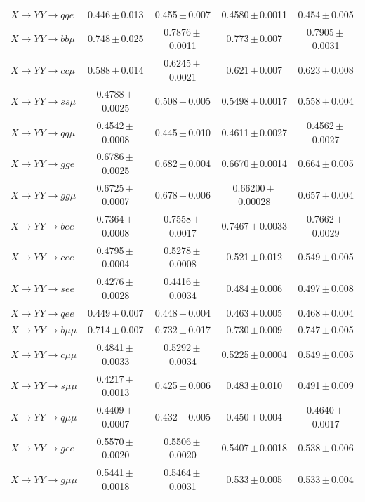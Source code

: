 \begin{landscape}
{\begin{longtable}{@{\extracolsep{\fill}}lcccc@{}}
$X\to YY\to qqe$ & 0.446\,$\pm$\,0.013 & 0.455\,$\pm$\,0.007 & 0.4580\,$\pm$\,0.0011 & 0.454\,$\pm$\,0.005 \\
$X\to YY\to bb\mu$ & 0.748\,$\pm$\,0.025 & 0.7876\,$\pm$\,0.0011 & 0.773\,$\pm$\,0.007 & 0.7905\,$\pm$\,0.0031 \\
$X\to YY\to cc\mu$ & 0.588\,$\pm$\,0.014 & 0.6245\,$\pm$\,0.0021 & 0.621\,$\pm$\,0.007 & 0.623\,$\pm$\,0.008 \\
$X\to YY\to ss\mu$ & 0.4788\,$\pm$\,0.0025 & 0.508\,$\pm$\,0.005 & 0.5498\,$\pm$\,0.0017 & 0.558\,$\pm$\,0.004 \\
$X\to YY\to qq\mu$ & 0.4542\,$\pm$\,0.0008 & 0.445\,$\pm$\,0.010 & 0.4611\,$\pm$\,0.0027 & 0.4562\,$\pm$\,0.0027 \\
$X\to YY\to gge$ & 0.6786\,$\pm$\,0.0025 & 0.682\,$\pm$\,0.004 & 0.6670\,$\pm$\,0.0014 & 0.664\,$\pm$\,0.005 \\
$X\to YY\to gg\mu$ & 0.6725\,$\pm$\,0.0007 & 0.678\,$\pm$\,0.006 & 0.66200\,$\pm$\,0.00028 & 0.657\,$\pm$\,0.004 \\
\midrule
$X\to YY\to bee$ & 0.7364\,$\pm$\,0.0008 & 0.7558\,$\pm$\,0.0017 & 0.7467\,$\pm$\,0.0033 & 0.7662\,$\pm$\,0.0029 \\
$X\to YY\to cee$ & 0.4795\,$\pm$\,0.0004 & 0.5278\,$\pm$\,0.0008 & 0.521\,$\pm$\,0.012 & 0.549\,$\pm$\,0.005 \\
$X\to YY\to see$ & 0.4276\,$\pm$\,0.0028 & 0.4416\,$\pm$\,0.0034 & 0.484\,$\pm$\,0.006 & 0.497\,$\pm$\,0.008 \\
$X\to YY\to qee$ & 0.449\,$\pm$\,0.007 & 0.448\,$\pm$\,0.004 & 0.463\,$\pm$\,0.005 & 0.468\,$\pm$\,0.004 \\
$X\to YY\to b\mu\mu$ & 0.714\,$\pm$\,0.007 & 0.732\,$\pm$\,0.017 & 0.730\,$\pm$\,0.009 & 0.747\,$\pm$\,0.005 \\
$X\to YY\to c\mu\mu$ & 0.4841\,$\pm$\,0.0033 & 0.5292\,$\pm$\,0.0034 & 0.5225\,$\pm$\,0.0004 & 0.549\,$\pm$\,0.005 \\
$X\to YY\to s\mu\mu$ & 0.4217\,$\pm$\,0.0013 & 0.425\,$\pm$\,0.006 & 0.483\,$\pm$\,0.010 & 0.491\,$\pm$\,0.009 \\
$X\to YY\to q\mu\mu$ & 0.4409\,$\pm$\,0.0007 & 0.432\,$\pm$\,0.005 & 0.450\,$\pm$\,0.004 & 0.4640\,$\pm$\,0.0017 \\
$X\to YY\to gee$ & 0.5570\,$\pm$\,0.0020 & 0.5506\,$\pm$\,0.0020 & 0.5407\,$\pm$\,0.0018 & 0.538\,$\pm$\,0.006 \\
$X\to YY\to g\mu\mu$ & 0.5441\,$\pm$\,0.0018 & 0.5464\,$\pm$\,0.0031 & 0.533\,$\pm$\,0.005 & 0.533\,$\pm$\,0.004 \\

\end{longtable}}
\end{landscape}
